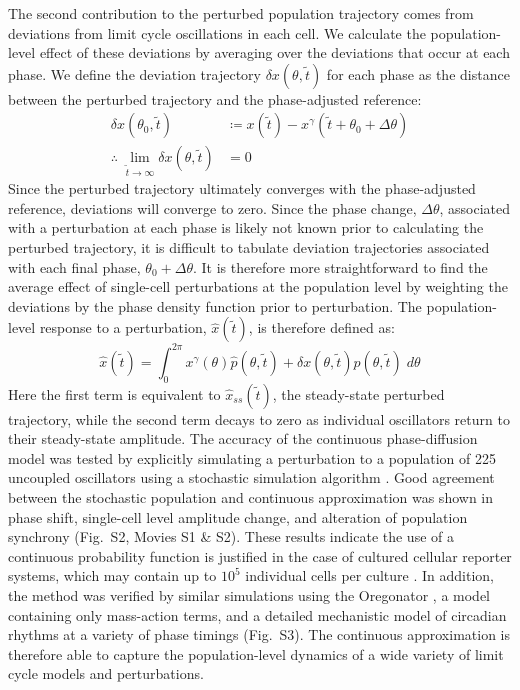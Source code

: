\documentclass[11pt, letterpaper]{article}
\providecommand{\DIFaddbegin}{} %
\providecommand{\DIFaddend}{} %
\begin{document}
The second contribution to the perturbed population trajectory comes from deviations from limit cycle oscillations in each cell.
We calculate the population-level effect of these deviations by averaging over the deviations that occur at each phase.
We define the deviation trajectory $\delta x(\theta, \tilde{t})$ for each phase as the distance between the perturbed trajectory and the phase-adjusted reference:
\begin{align}
  \delta x(\theta_0, \tilde{t}) &\coloneqq x(\tilde{t}) - x^\gamma(\tilde{t} + \theta_0 + \Delta \theta) \\
  \therefore\; \lim_{\tilde{t} \to \infty} \delta x(\theta, \tilde{t}) &= 0
\end{align}
Since the perturbed trajectory ultimately converges with the phase-adjusted reference, deviations will converge to zero.
Since the phase change, $\Delta\theta$, associated with a perturbation at each phase is likely not known prior to calculating the perturbed trajectory, it is difficult to tabulate deviation trajectories associated with each final phase, $\theta_0 + \Delta\theta$.
It is therefore more straightforward to find the average effect of single-cell perturbations at the population level by weighting the deviations by the phase density function prior to perturbation.
The population-level response to a perturbation, $\hat{x}(\tilde{t})$, is therefore defined as:
\begin{equation}
  \hat{x}(\tilde{t}) = \int_0^{2\pi} x^\gamma(\theta)\hat{p}(\theta, \tilde{t}) + \delta x(\theta, \tilde{t})p(\theta, \tilde{t}) \; d\theta
  \DIFaddbegin \label{eq:xhat}
\DIFaddend \end{equation}
Here the first term is equivalent to $\hat{x}_{ss}(\tilde{t})$, the steady-state perturbed trajectory, while the second term decays to zero as individual oscillators return to their steady-state amplitude.
The accuracy of the continuous phase-diffusion model was tested by explicitly simulating a perturbation to a population of 225 uncoupled oscillators using a stochastic simulation algorithm \cite{Gillespie1977, Sanft2011a}.
Good agreement between the stochastic population and continuous approximation was shown in phase shift, single-cell level amplitude change, and alteration of population synchrony (Fig.~S2, Movies S1 \& S2).
These results indicate the use of a continuous probability function is justified in the case of cultured cellular reporter systems, which may contain up to $10^5$ individual cells per culture \cite{Welsh2004}.
In addition, the method was verified by similar simulations using the Oregonator \cite{Field1974}, a model containing only mass-action terms, and a detailed mechanistic model of circadian rhythms \cite{Hirota2012} at a variety of phase timings (Fig.~S3).
The continuous approximation is therefore able to capture the population-level dynamics of a wide variety of limit cycle models and perturbations.
\end{document}
